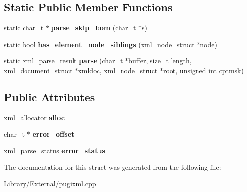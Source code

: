 \subsection*{Static Public Member Functions}
\begin{DoxyCompactItemize}
\item 
\hypertarget{structxml__parser_af0a3f5a488b05da9fa2c87e1dd1f9eda}{}static char\+\_\+t $\ast$ {\bfseries parse\+\_\+skip\+\_\+bom} (char\+\_\+t $\ast$s)\label{structxml__parser_af0a3f5a488b05da9fa2c87e1dd1f9eda}

\item 
\hypertarget{structxml__parser_a6be4da5b3206913d0e3bd8320394df41}{}static bool {\bfseries has\+\_\+element\+\_\+node\+\_\+siblings} (xml\+\_\+node\+\_\+struct $\ast$node)\label{structxml__parser_a6be4da5b3206913d0e3bd8320394df41}

\item 
\hypertarget{structxml__parser_a4bf0acd166edf3fc6cc9543002ff6f5d}{}static xml\+\_\+parse\+\_\+result {\bfseries parse} (char\+\_\+t $\ast$buffer, size\+\_\+t length, \hyperlink{structxml__document__struct}{xml\+\_\+document\+\_\+struct} $\ast$xmldoc, xml\+\_\+node\+\_\+struct $\ast$root, unsigned int optmsk)\label{structxml__parser_a4bf0acd166edf3fc6cc9543002ff6f5d}

\end{DoxyCompactItemize}
\subsection*{Public Attributes}
\begin{DoxyCompactItemize}
\item 
\hypertarget{structxml__parser_a213cf019cbf45f5049acdcae296a2976}{}\hyperlink{structxml__allocator}{xml\+\_\+allocator} {\bfseries alloc}\label{structxml__parser_a213cf019cbf45f5049acdcae296a2976}

\item 
\hypertarget{structxml__parser_a2476a71cd7e67b3f4bdbcd1323524503}{}char\+\_\+t $\ast$ {\bfseries error\+\_\+offset}\label{structxml__parser_a2476a71cd7e67b3f4bdbcd1323524503}

\item 
\hypertarget{structxml__parser_a0555859911674e5a7a349447d6533383}{}xml\+\_\+parse\+\_\+status {\bfseries error\+\_\+status}\label{structxml__parser_a0555859911674e5a7a349447d6533383}

\end{DoxyCompactItemize}


The documentation for this struct was generated from the following file\+:\begin{DoxyCompactItemize}
\item 
Library/\+External/pugixml.\+cpp\end{DoxyCompactItemize}
